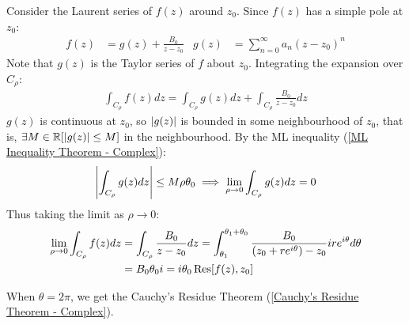 \documentclass[12pt, english]{book}
\makeatletter
\renewenvironment{proof}[1][\proofname]{\par
	\pushQED{\qed}%
	\normalfont \topsep6\p@\@plus6\p@\relax
	\list{}{%
		\settowidth{\leftmargin}{\itshape\proofname:\hskip\labelsep}%
		\setlength{\labelwidth}{0pt}%
		\setlength{\itemindent}{-\leftmargin}%
		}%
	\item[\hskip\labelsep\itshape#1\@addpunct{:}]\ignorespaces
	}{\popQED\endlist\@endpefalse}
\makeatother
\begin{document}
	\begin{proof}
		Consider the Laurent series of \(f(z)\) around \(z_0\). Since \(f(z)\) has a simple pole at \(z_0\):
		\begin{align*}
				f(z) &= g(z) +  \frac{B_0}{z-z_0} &
				g(z) &= \sum_{n=0}^{\infty} a_n(z-z_0)^n
		\end{align*}
		Note that \(g(z)\) is the Taylor series of \(f\) about \(z_0\). Integrating the expansion over \(C_\rho\):
		\begin{align*}
			\int_{C_\rho} f(z) dz 
			= \int_{C_\rho} g(z) dz + \int_{C_\rho} \frac{B_0}{z-z_0} dz
		\end{align*}
		\(g(z)\) is continuous at \(z_0\), so \(\abs{g(z)}\) is bounded in some neighbourhood of \(z_0\), that is, \(\exists M \in \mathbb{R}[\abs{g(z)} \leq M]\) in the neighbourhood. By the ML inequality (\cref{ML Inequality Theorem - Complex}):
		\begin{align*}
			\abs{\int_{C_\rho} g(z) dz} \leq M \rho \theta_0
			\implies \lim_{\rho \rightarrow 0} \int_{C_\rho} g(z) dz = 0 
		\end{align*}
		Thus taking the limit as \(\rho \rightarrow 0\):
		\begin{align*}
			\lim_{\rho \rightarrow 0}
			\int_{C_\rho} f(z) dz 
			&= \int_{C_\rho} \frac{B_0}{z-z_0} dz 
			= \int_{\theta_1}^{\theta_1 + \theta_0} \frac{B_0}{(z_0 + re^{i\theta}) - z_0} ire^{i\theta} d\theta  \\
			&= B_0 \theta_0 i
			= i\theta_0 \Res[f(z), z_0]
		\end{align*}
	\end{proof}
	\begin{observation}
		When \(\theta = 2\pi\), we get the Cauchy's Residue Theorem (\cref{Cauchy's Residue Theorem - Complex}).
	\end{observation}
\end{document}
